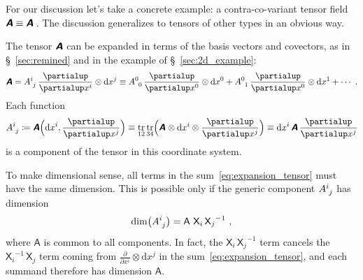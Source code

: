 \documentclass[\ifafour a4paper,12pt,\else a5paper,10pt,\fi%
onecolumn,oneside,article,%
british%
]{memoir}
\makeatletter
\theoremstyle{remark}
\theoremstyle{innote}
\newcommand*{\mathte}[1]{\textbf{\textit{\textsf{#1}}}}
\newcommand*{\de}{\partialup}%
\newcommand*{\di}{\mathrm{d}}%
\DeclareMathOperator{\tr}{tr}%
\newcommand*{\defd}{\coloneqq}
\renewcommand*{\|}[1][]{\nonscript\,#1\vert\nonscript\;\mathopen{}}
\newcommand*{\sect}{\S}%
\newcommand*{\q}{}%
\DeclareRobustCommand*{\q}{%
  \mathord{\mathpalette\bigcdot@{}}%
}
\newcommand*{\bigcdot@scalefactor}{0.7}
\newcommand*{\bigcdot@widthfactor}{1.5}
\newcommand*{\bigcdot@}[2]{%
  \sbox0{$#1\vcenter{}$}%
  \sbox2{$#1\cdot\m@th$}%
  \hbox to \bigcdot@widthfactor\wd2{%
    \hfil
    \raise\ht0\hbox{%
      \scalebox{\bigcdot@scalefactor}{%
        \lower\ht0\hbox{$#1\bullet\m@th$}%
      }%
    }%
    \hfil
  }%
}
\newcommand*{\Xx}{\textsf{X}}
\newcommand*{\Aa}{\textsf{A}}
\newcommand*{\yA}{\mathte{A}}
\renewcommand*{\i}{\indices}
\newcommand*{\dex}[1][i]{\frac{\de}{\de x^{#1}}}
\newcommand*{\dix}[1][i]{\di x^{#1}}
\makeatother
\begin{document}
For our discussion let's take a concrete example: a contra-co-variant tensor
field $\yA \equiv \yA\i{^{\q}_{\q}}\,$. The discussion generalizes to tensors
of other types in an obvious way.

The tensor $\yA$ can be expanded in terms of the basis vectors and
covectors, as in \sect~\ref{sec:remined} and in the example of
\sect~\ref{sec:2d_example}:
\begin{equation}
  \label{eq:expansion_tensor}
  \yA = A\i{^{i}_{j}}\, \dex\otimes\dix[j]
  \equiv A\i{^{0}_{0}}\,\dex[0]\otimes\dix[0] + 
  A\i{^{0}_{1}}\,\dex[0]\otimes\dix[1] + \dotsb {}\ .
\end{equation}
Each function
\begin{equation}
  A\i{^{i}_{j}} \defd  \yA\Bigl(\dix, \dex[j]\Bigr)
  \equiv \tr_{12}\tr_{34}\Bigl(\yA\i{^{\q}_{\q}} \otimes \dix \otimes
  \dex[j]\Bigr)
  \equiv \dix\,\yA\,\dex[j]
  \label{eq:components_def}
\end{equation}
is a component of the tensor in this coordinate system.

\medskip

To make dimensional sense, all terms in the sum~\eqref{eq:expansion_tensor}
must have the same dimension. This is possible only if the generic
component $A\i{^{i}_{j}}$ has dimension
\begin{equation}
  \label{eq:dim_component}
  \dim\bigl(A\i{^{i}_{j}}\bigr) = \Aa\ {\Xx_{i}}\,{\Xx_{j}}^{-1}\ ,
\end{equation}
where $\Aa$ is common to all components. In fact, the
${\Xx_{i}}\,{\Xx_{j}}^{-1}$ term cancels the ${\Xx_{i}}^{-1}\,{\Xx_{j}}$
term coming from $\dex\otimes\dix[j]$ in the
sum~\eqref{eq:expansion_tensor}, and each summand therefore has dimension
$\Aa$.
\end{document}
